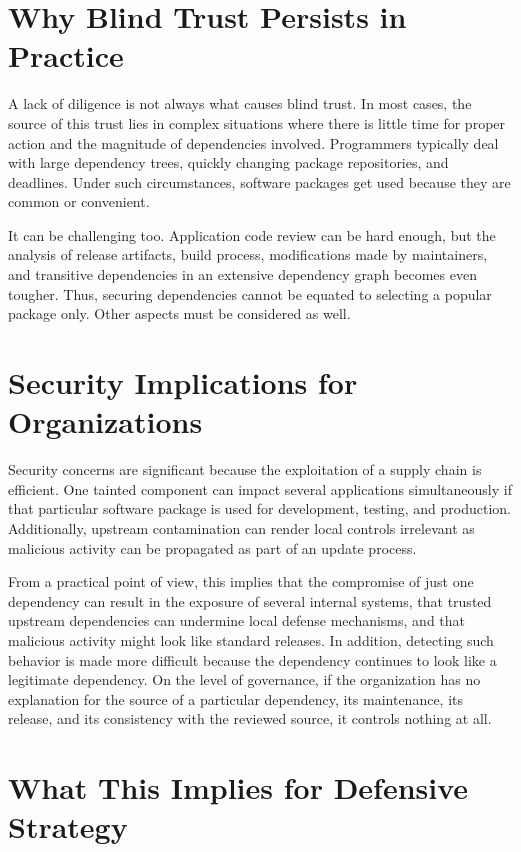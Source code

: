\section{Why Blind Trust Persists in Practice}

A lack of diligence is not always what causes blind trust. In most cases, the source of this trust lies in complex situations where there is little time for proper action and the magnitude of dependencies involved. Programmers typically deal with large dependency trees, quickly changing package repositories, and deadlines. Under such circumstances, software packages get used because they are common or convenient.

It can be challenging too. Application code review can be hard enough, but the analysis of release artifacts, build process, modifications made by maintainers, and transitive dependencies in an extensive dependency graph becomes even tougher. Thus, securing dependencies cannot be equated to selecting a popular package only. Other aspects must be considered as well.

\section{Security Implications for Organizations}

Security concerns are significant because the exploitation of a supply chain is efficient. One tainted component can impact several applications simultaneously if that particular software package is used for development, testing, and production. Additionally, upstream contamination can render local controls irrelevant as malicious activity can be propagated as part of an update process.

From a practical point of view, this implies that the compromise of just one dependency can result in the exposure of several internal systems, that trusted upstream dependencies can undermine local defense mechanisms, and that malicious activity might look like standard releases. In addition, detecting such behavior is made more difficult because the dependency continues to look like a legitimate dependency. On the level of governance, if the organization has no explanation for the source of a particular dependency, its maintenance, its release, and its consistency with the reviewed source, it controls nothing at all.

\section{What This Implies for Defensive Strategy}

